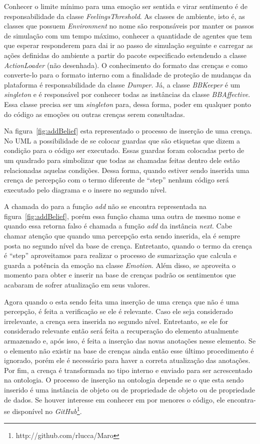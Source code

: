 Conhecer o limite mínimo para uma emoção ser sentida e virar sentimento é de
responsabilidade da classe \emph{FeelingsThreshold}. As classes de ambiente,
isto é, as classes que possuem \emph{Environment} no nome são responsáveis por
manter os passos de simulação com um tempo máximo, conhecer a quantidade de
agentes que tem que esperar responderem para dai ir ao passo de simulação
seguinte e carregar as ações definidas do ambiente a partir do pacote
especificado estendendo a classe \emph{ActionLoader} (não desenhada). O
conhecimento do formato das crenças e como converte-lo para o formato interno
com a finalidade de proteção de mudanças da plataforma \jason é
responsabilidade da classe \emph{Dumper}. Já, a classe \emph{BBKeeper} é um
\emph{singleton} e é responsável por conhecer todas as instâncias da classe
\emph{BBAffective}. Essa classe precisa ser um \emph{singleton} para, dessa
forma, poder em qualquer ponto do código as emoções ou outras crenças serem
consultadas.

Na figura~\ref{fig:addBelief} esta representado o processo de inserção de
uma crença. No UML a possibilidade de se colocar guardas que são etiquetas que
dizem a condição para o código ser executado. Essas guardas foram colocadas
perto de um quadrado para simbolizar que todas as chamadas feitas dentro dele
estão relacionadas aquelas condições. Dessa forma, quando estiver sendo
inserida uma crença de percepção com o termo diferente de ``step'' nenhum código será
executado pelo diagrama e o insere no segundo nível.

A chamada do \jason para a função \emph{add} não se encontra representada na
figura~\ref{fig:addBelief}, porém essa função chama uma outra de mesmo nome e
quando essa retorna falso é chamada a função \emph{add} da instância
\emph{next}. Cabe chamar atenção que quando uma percepção esta sendo inserida,
ela é sempre posta no segundo nível da base de crença. Entretanto, quando o
termo da crença é ``step'' aproveitamos para realizar o processo de
sumarização que calcula e guarda a potência da emoção na classe
\emph{Emotion}. Além disso, se aproveita o momento para obter e inserir na
base de crenças padrão os sentimentos que acabaram de sofrer atualização em
seus valores.

Agora quando o esta sendo feita uma inserção de uma crença que não é uma
percepção, é feita a verificação se ele é relevante. Caso ele seja considerado
irrelevante, a crença sera inserida no segundo nível. Entretanto, se ele for
considerado relevante então será feita a recuperação do elemento atualmente
armazenado e, após isso, é feita a inserção das novas anotações nesse
elemento. Se o elemento não existir na base de crenças ainda então esse último
procedimento é ignorado, porém ele é necessário para haver a correta
atualização das anotações. Por fim, a crença é transformada no tipo interno e
enviado para ser acrescentado na ontologia.
%
O processo de inserção na ontologia depende se o que esta sendo inserido é uma
instância de objeto ou de propriedade de objeto ou de propriedade de dados. Se
houver interesse em conhecer em por menores o código, ele encontra-se
disponível no \emph{GitHub}\footnote{http://github.com/rlucca/Maro}.

